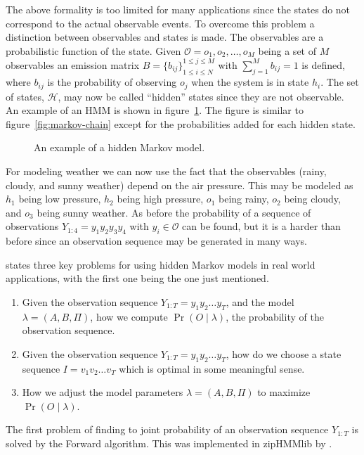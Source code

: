 The above formality is too limited for many applications since the states do
not correspond to the actual observable events. To overcome this problem a
distinction between observables and states is made. The observables are a
probabilistic function of the state. Given
$\mathcal{O} = {o_1, o_2, \dots, o_M}$ being a set of $M$ observables an
emission matrix $B = {\{b_{ij}\}}_{1 \le i \le N}^{1 \le j \le M}$ with
$\sum_{j=1}^M b_{ij} = 1$ is defined, where $b_{ij}$ is the probability of
observing $o_j$ when the system is in state $h_i$. The set of states,
$\mathcal{H}$, may now be called ``hidden'' states since they are not
observable. An example of an HMM is shown in
figure~\ref{fig:hidden-markov-model}. The figure is similar to
figure~\ref{fig:markov-chain} except for the probabilities added for each
hidden state.

\begin{figure}
  \centering
  
  \caption{An example of a hidden Markov model.}
  \label{fig:hidden-markov-model}
\end{figure}

For modeling weather we can now use the fact that the observables (rainy,
cloudy, and sunny weather) depend on the air pressure. This may be modeled as
$h_1$ being low pressure, $h_2$ being high pressure, $o_1$ being rainy, $o_2$
being cloudy, and $o_3$ being sunny weather. As before the probability of a
sequence of observations $Y_{1:4} = y_1y_2y_3y_4$ with $y_i \in \mathcal{O}$
can be found, but it is a harder than before since an observation sequence may be
generated in many ways.

\citet{rabiner1989tutorial} states three key problems for using hidden Markov
models in real world applications, with the first one being the one just
mentioned.
\begin{enumerate}
\item Given the observation sequence $Y_{1:T} = y_1y_2\dots{}y_T$, and the
  model $\lambda = (A, B, \Pi)$, how we compute $\Pr(O \mid \lambda)$, the
  probability of the observation sequence.
\item Given the observation sequence $Y_{1:T} = y_1y_2\dots{}y_T$, how do we
  choose a state sequence $I = v_1v_2\dots{}v_T$ which is optimal in some
  meaningful sense.
\item How we adjust the model parameters $\lambda = (A, B, \Pi)$ to maximize
  $\Pr(O \mid \lambda)$.
\end{enumerate}

The first problem of finding to joint probability of an observation sequence
$Y_{1:T}$ is solved by the Forward algorithm. This was implemented in zipHMMlib
by \citet{sand2013ziphmmlib}.

